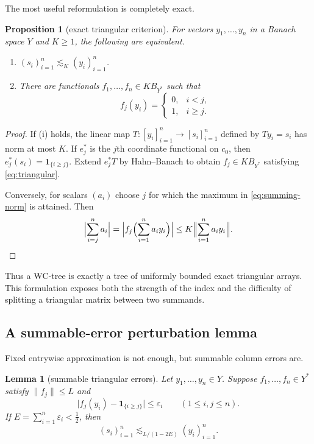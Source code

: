 \documentclass[11pt]{article}
\newtheorem{proposition}[theorem]{Proposition}
\newtheorem{lemma}[theorem]{Lemma}
\theoremstyle{definition}
\theoremstyle{remark}
\newcommand{\WC}{\mathrm{WC}}
\newcommand{\eps}{\varepsilon}
\begin{document}
The most useful reformulation is completely exact.

\begin{proposition}[exact triangular criterion]\label{prop:triangular}
For vectors $y_1,\dots,y_n$ in a Banach space $Y$ and $K\geq1$, the following are equivalent.
\begin{enumerate}[label=\textup{(\roman*)}]
\item $(s_i)_{i=1}^n\lesssim_K(y_i)_{i=1}^n$.
\item There are functionals $f_1,\dots,f_n\in K B_{Y^*}$ such that
\begin{equation}\label{eq:triangular}
 f_j(y_i)=
 \begin{cases}
 0,&i<j,\\
 1,&i\geq j.
 \end{cases}
\end{equation}
\end{enumerate}
\end{proposition}

\begin{proof}
If (i) holds, the linear map $T:[y_i]_{i=1}^n\to[s_i]_{i=1}^n$ defined by $Ty_i=s_i$ has norm at most $K$.  If $e_j^*$ is the $j$th coordinate functional on $c_0$, then $e_j^*(s_i)=\mathbf 1_{\{i\geq j\}}$.  Extend $e_j^*T$ by Hahn--Banach to obtain $f_j\in K B_{Y^*}$ satisfying \eqref{eq:triangular}.

Conversely, for scalars $(a_i)$ choose $j$ for which the maximum in \eqref{eq:summing-norm} is attained.  Then
\[
 \Bigl|\sum_{i=j}^n a_i\Bigr|
 =\Bigl|f_j\Bigl(\sum_{i=1}^n a_i y_i\Bigr)\Bigr|
 \leq K\Bigl\|\sum_{i=1}^n a_i y_i\Bigr\|.
\]
\end{proof}

Thus a $\WC$-tree is exactly a tree of uniformly bounded exact triangular arrays.  This formulation exposes both the strength of the index and the difficulty of splitting a triangular matrix between two summands.

\subsection{A summable-error perturbation lemma}

Fixed entrywise approximation is not enough, but summable column errors are.

\begin{lemma}[summable triangular errors]\label{lem:summable-errors}
Let $y_1,\dots,y_n\in Y$.  Suppose $f_1,\dots,f_n\in Y^*$ satisfy $\|f_j\|\leq L$ and
\[
  \bigl|f_j(y_i)-\mathbf 1_{\{i\geq j\}}\bigr|\leq\eps_i
  \qquad(1\leq i,j\leq n).
\]
If $E=\sum_{i=1}^n\eps_i<\tfrac12$, then
\[
   (s_i)_{i=1}^n\lesssim_{L/(1-2E)}(y_i)_{i=1}^n.
\]
\end{lemma}
\end{document}
